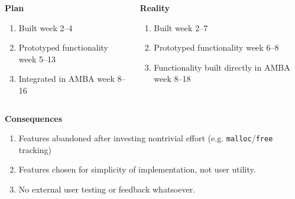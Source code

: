 \begin{frame}
	\begin{columns}[t]
		\begin{column}{0.4\textwidth}
			\textbf{Plan}
			\begin{enumerate}
				\item Built \stoe{} week 2--4
				\item Prototyped functionality week 5--13
				\item Integrated in AMBA week 8--16
			\end{enumerate}
		\end{column}
		\begin{column}{0.4\textwidth}
			\textbf{Reality}
			\begin{enumerate}
				\item Built \stoe{} week 2--7
				\item Prototyped functionality week 6--8
				\item Functionality built directly in AMBA week 8--18
			\end{enumerate}
		\end{column}
	\end{columns}
	\textbf{Consequences}
	\begin{enumerate}

		\item Features abandoned after investing nontrivial effort (e.g.
		      \texttt{malloc}/\texttt{free} tracking)

		\item Features chosen for simplicity of implementation, not user
		      utility.

		\item No external user testing or feedback whatsoever.

	\end{enumerate}
\end{frame}
